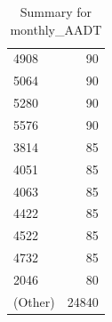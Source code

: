 \begin{table}[ht]
\begin{tabular}{lr}
  4908 &  90 \\ 
  5064 &  90 \\ 
  5280 &  90 \\ 
  5576 &  90 \\ 
  3814 &  85 \\ 
  4051 &  85 \\ 
  4063 &  85 \\ 
  4422 &  85 \\ 
  4522 &  85 \\ 
  4732 &  85 \\ 
  2046 &  80 \\ 
  (Other) & 24840 \\ 
   \hline
\end{tabular}
\caption{Summary for monthly_AADT} 
\label{tab: monthly_AADT}
\end{table}
